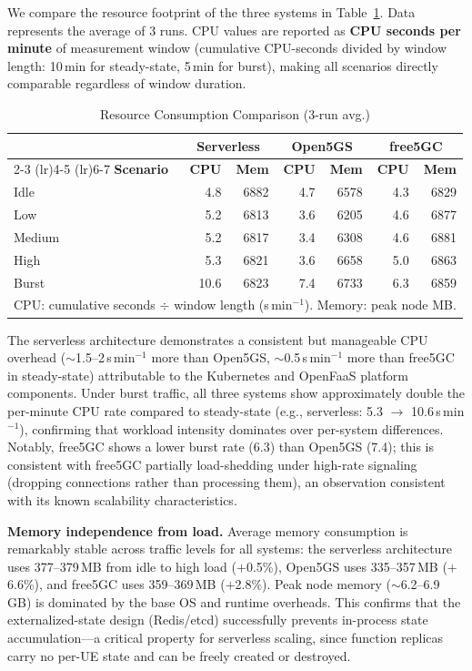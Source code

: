 \documentclass[conference]{IEEEtran}
\begin{document}
We compare the resource footprint of the three systems in Table~\ref{tab:resource-comparison}. Data represents the average of 3 runs. CPU values are reported as \textbf{CPU seconds per minute} of measurement window (cumulative CPU-seconds divided by window length: 10\,min for steady-state, 5\,min for burst), making all scenarios directly comparable regardless of window duration.

\begin{table}[t]
\centering
\caption{Resource Consumption Comparison (3-run avg.)}
\label{tab:resource-comparison}
\footnotesize
\begin{tabular}{@{}l rr rr rr@{}}
\toprule
 & \multicolumn{2}{c}{\textbf{Serverless}} & \multicolumn{2}{c}{\textbf{Open5GS}} & \multicolumn{2}{c}{\textbf{free5GC}} \\
\cmidrule(lr){2-3} \cmidrule(lr){4-5} \cmidrule(lr){6-7}
\textbf{Scenario} & \textbf{CPU} & \textbf{Mem} & \textbf{CPU} & \textbf{Mem} & \textbf{CPU} & \textbf{Mem} \\
\midrule
Idle   & 4.8 & 6882 & 4.7 & 6578 & 4.3 & 6829 \\
Low    & 5.2 & 6813 & 3.6 & 6205 & 4.6 & 6877 \\
Medium & 5.2 & 6817 & 3.4 & 6308 & 4.6 & 6881 \\
High   & 5.3 & 6821 & 3.6 & 6658 & 5.0 & 6863 \\
Burst  & 10.6 & 6823 & 7.4 & 6733 & 6.3 & 6859 \\
\bottomrule
\multicolumn{7}{l}{\scriptsize CPU: cumulative seconds $\div$ window length (s\,min$^{-1}$). Memory: peak node MB.}
\end{tabular}
\end{table}

The serverless architecture demonstrates a consistent but manageable CPU overhead ($\sim$1.5--2\,s\,min$^{-1}$ more than Open5GS, $\sim$0.5\,s\,min$^{-1}$ more than free5GC in steady-state) attributable to the Kubernetes and OpenFaaS platform components. Under burst traffic, all three systems show approximately double the per-minute CPU rate compared to steady-state (e.g., serverless: 5.3 $\to$ 10.6\,s\,min$^{-1}$), confirming that workload intensity dominates over per-system differences. Notably, free5GC shows a lower burst rate (6.3) than Open5GS (7.4); this is consistent with free5GC partially load-shedding under high-rate signaling (dropping connections rather than processing them), an observation consistent with its known scalability characteristics.

\textbf{Memory independence from load.} Average memory consumption is remarkably stable across traffic levels for all systems: the serverless architecture uses 377--379\,MB from idle to high load ($+$0.5\%), Open5GS uses 335--357\,MB ($+$6.6\%), and free5GC uses 359--369\,MB ($+$2.8\%). Peak node memory ($\sim$6.2--6.9\,GB) is dominated by the base OS and runtime overheads. This confirms that the externalized-state design (Redis/etcd) successfully prevents in-process state accumulation---a critical property for serverless scaling, since function replicas carry no per-UE state and can be freely created or destroyed.
\end{document}
